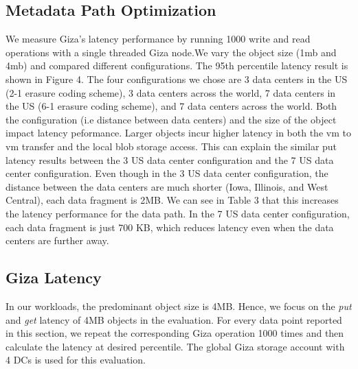 {\subsection{Metadata Path Optimization}
We measure Giza's latency performance by running 1000 write and read operations with a single threaded Giza node.We vary the object size (1mb and 4mb) and compared different configurations. 
The 95th percentile latency result is shown in Figure 4. The four configurations we chose are 3 data centers in the US (2-1 erasure coding scheme), 3 data centers across the world, 7 data centers in the US (6-1 erasure coding scheme), and 7 data centers across the world. Both the configuration (i.e distance between data centers) and the size of the object impact latency peformance. Larger objects incur higher latency in both the vm to vm transfer and the local blob storage access. This can explain the similar put latency results between the 3 US data center configuration and the 7 US data center configuration. Even though in the 3 US data center configuration, the distance between the data centers are much shorter (Iowa, Illinois, and West Central), each data fragment is 2MB. We can see in Table 3 that this increases the latency performance for the data path. In the 7 US data center configuration, each data fragment is just 700 KB, which reduces latency even when the data centers are further away. 

}

\subsection{Giza Latency}

In our workloads, the predominant object size is 4MB. Hence, we focus on the {\em put} and {\em get} latency of 4MB objects in the evaluation. For every data point reported in this section, we repeat the corresponding Giza operation 1000 times and then calculate the latency at desired percentile. The global Giza storage account with 4 DCs is used for this evaluation.

